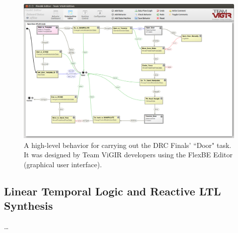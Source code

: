 \begin{figure}[t]
\centering
\includegraphics[width=0.99\columnwidth,clip]{./img/behavior_open_door.png}
\caption{A high-level behavior for carrying out the DRC Finals' ``Door" task.
It was designed by Team ViGIR developers using the FlexBE Editor (graphical user interface).
}
\label{Fig:FlexBESM}
\end{figure}

\subsection{Linear Temporal Logic and Reactive LTL Synthesis}

\ldots
